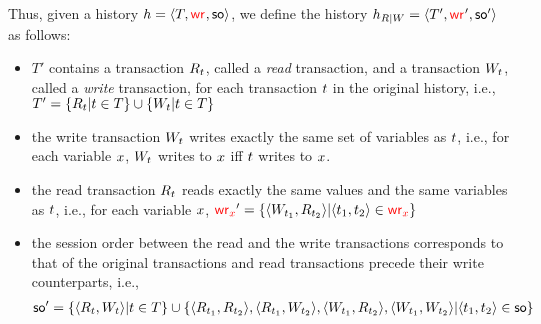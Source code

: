 Thus, given a history $\hist = \tup{T, \wro, \so}$, we define the history $\hist_{R|W} = \tup{T', \wro', \so'}$ as follows:
\begin{itemize}
 \item $T'$ contains a transaction $R_\tr$, called a \emph{read} transaction, and a transaction $W_\tr$, called a \emph{write} transaction, for each transaction $\tr$ in the original history, i.e., $T' = \{R_\tr | \tr \in T\} \cup \{W_\tr | \tr \in T\}$
 \item the write transaction $W_{\tr}$ writes exactly the same set of variables as $\tr$, i.e., for each variable $\xvar$, $W_{\tr}$ writes to $\xvar$ iff $\tr$ writes to $\xvar$.
 \item the read transaction $R_{\tr}$ reads exactly the same values and the same variables as $\tr$, i.e., for each variable $\xvar$,
 $\wro[\xvar]' = \{\tup{W_{\tr_1}, R_{\tr_2}} | \tup{\tr_1, \tr_2} \in \wro[\xvar]\}$
 \item the session order between the read and the write transactions corresponds to that of the original transactions and read transactions precede their write counterparts, i.e.,
 \begin{align*}
 \so' = \{\tup{R_\tr, W_\tr} | \tr \in T\} \cup \{\tup{R_{\tr_1}, R_{\tr_2}}, \tup{R_{\tr_1}, W_{\tr_2}}, \tup{W_{\tr_1}, R_{\tr_2}}, \tup{W_{\tr_1}, W_{\tr_2}} | \tup{\tr_1,\tr_2} \in \so \}
 \end{align*}
\end{itemize}

